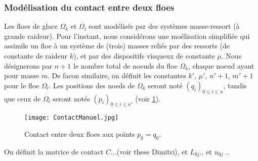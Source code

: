  




\subsubsection{Modélisation du contact entre deux floes}

Les floes de glace $\Omega_k$ et $\Omega_l$ sont modélisés par des systèmes masse-ressort (à grande raideur). Pour l'instant, nous considérons une moélisation simplifiée qui assimile un floe à un système de (trois) masses reliés par des ressorts (de constante de raideur $k$), et par des dispositifs visqueux de constante $\mu$.
Nous désignerons par $n+1$ le nombre total de noeuds du floe $\Omega_k$, chaque noeud ayant pour masse $m$. De facon similaire, on définit les constantes $k'$, $\mu'$, $n'+1$, $m'+1$ pour le floe $\Omega_l$. Les positions des noeds de $\Omega_k$ seront noté $(q_i)_{0\leq i\leq n}$, tandis que ceux de $\Omega_l$ seront notés $(p_i)_{0 \leq i\leq n'}$ (voir \cref{fig:contactmanuel}). 

\begin{figure}[!h]
    \centering
    \texttt{[image: ContactManuel.jpg]}
    \caption{Contact entre deux floes aux points $p_0 = q_0$.}
    \label{fig:contactmanuel}
\end{figure}

\noindent On définit la matrice de contact $C$...(voir these Dimitri), et $L_{0j}$.. et $u_{0j}$ ..

